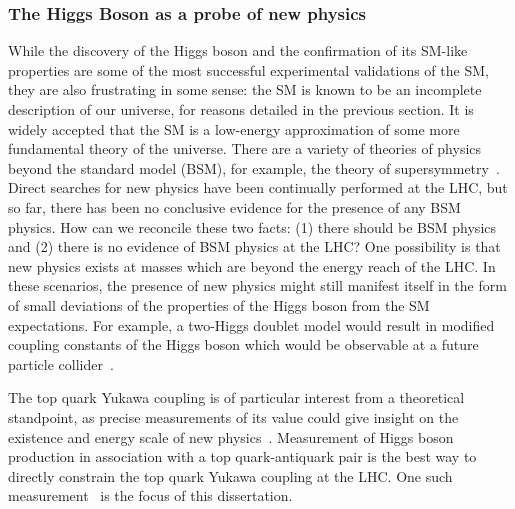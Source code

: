 \subsubsection{The Higgs Boson as a probe of new physics}
While the discovery of the Higgs boson and the confirmation of its SM-like properties are some of the most successful experimental validations of the SM, they are also frustrating in some sense:
the SM is known to be an incomplete description of our universe, for reasons detailed in the previous section.
It is widely accepted that the SM is a low-energy approximation of some more fundamental theory of the universe.
There are a variety of theories of physics beyond the standard model (BSM), for example, the theory of supersymmetry~\cite{Martin:1997ns}.
Direct searches for new physics have been continually performed at the LHC, but so far, there has been no conclusive evidence for the presence of any BSM physics.
How can we reconcile these two facts: (1) there should be BSM physics and (2) there is no evidence of BSM physics at the LHC?
One possibility is that new physics exists at masses which are beyond the energy reach of the LHC.
In these scenarios, the presence of new physics might still manifest itself in the form of small deviations of the properties of the Higgs boson from the SM expectations.
For example, a two-Higgs doublet model would result in modified coupling constants of the Higgs boson which would be observable at a future particle collider~\cite{Kanemura:2004mg}.

The top quark Yukawa coupling is of particular interest from a theoretical standpoint, as precise measurements of its value could give insight on the existence and energy scale of new physics~\cite{why_care_top_yukawa}.
Measurement of Higgs boson production in association with a top quark-antiquark pair is the best way to directly constrain the top quark Yukawa coupling at the LHC.
One such measurement~\cite{tth_observation} is the focus of this dissertation.

